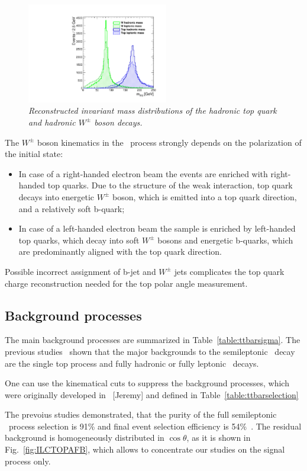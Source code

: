 \begin{figure}[h]
	{\centering
		\includegraphics[width=0.55\textwidth]{ILD/plots/top-w-mass-new.pdf}
		\caption{\sl Reconstructed invariant mass distributions of the hadronic top quark and hadronic $W^\pm$ boson decays.
		}
		\label{fig:TopWmass_3}
	}
	
\end{figure}

The $W^\pm$ boson kinematics in the \ttbar\ process strongly depends on the polarization of the initial state:
\begin{itemize}
	\item In case of a right-handed electron beam the events are enriched with right-handed top quarks. Due to the structure of the weak interaction, top quark decays into energetic $W^\pm$ boson, which is emitted into a top quark direction, and a relatively soft b-quark;
	\item In case of a left-handed electron beam the sample is enriched by left-handed top quarks, which decay into soft $W^\pm$ bosons and energetic b-quarks, which are predominantly aligned with the top quark direction. 
\end{itemize}
Possible incorrect assignment of b-jet and $W^\pm$ jets complicates the top quark charge reconstruction needed for the top polar angle measurement. 

\subsection{Background processes}
The main background processes are summarized in Table~\ref{table:ttbarsigma}. 
The previous studies~\cite{bib:ILCTOP}\cite{bib:Doublet} shown that the major backgrounds to the semileptonic \ttbar\ decay are the single top process and fully hadronic or fully leptonic \ttbar\ decays. 


One can use the kinematical cuts to suppress the background processes, which were originally developed in ~\cite{bib:Doublet}[Jeremy] and defined in Table~\ref{table:ttbarselection}

The prevoius studies demonstrated, that the purity of the full semileptonic \ttbar\ process selection is 91\% and final event selection efficiency is 54\%~\cite{bib:ILCTOP}.
The residual background is homogeneously distributed in $\cos\theta$, as it is shown in Fig.~\ref{fig:ILCTOPAFB}, which allows to concentrate our studies on the signal process only. 

